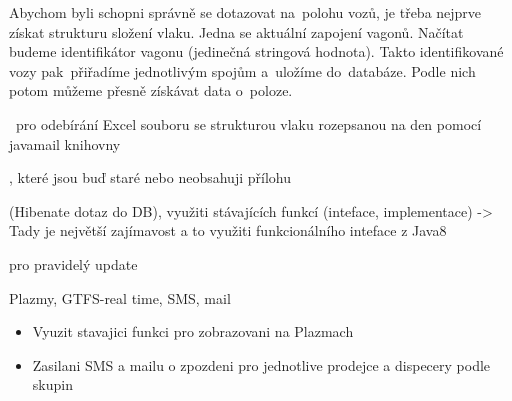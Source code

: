 Abychom byli schopni správně se dotazovat na~polohu vozů, je třeba nejprve získat strukturu složení vlaku. Jedna se aktuální zapojení vagonů. Načítat budeme identifikátor vagonu (jedinečná stringová hodnota). Takto identifikované vozy pak~přiřadíme jednotlivým spojům a~uložíme do~databáze. Podle nich potom můžeme přesně získávat data o~poloze.

	
	
	
	
	
	
~pro odebírání Excel souboru se strukturou vlaku rozepsanou na den
 pomocí javamail knihovny
	
	
, které jsou buď staré nebo neobsahuji přílohu
	
	
	
 (Hibenate dotaz do DB), využiti stávajících funkcí
 (inteface, implementace) -> Tady je největší zajímavost a to využiti funkcionálního inteface z Java8
	
	
 pro pravidelý update
	
	

Plazmy, GTFS-real time, SMS, mail

\begin{itemize}
	\item Vyuzit stavajici funkci pro zobrazovani na Plazmach
	\item Zasilani SMS a mailu o zpozdeni pro jednotlive prodejce a dispecery podle skupin
\end{itemize}

